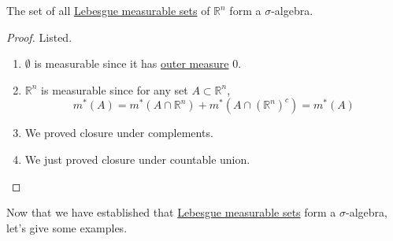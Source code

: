   \begin{corollary}
    \label{thm:measurable-sets-form-a-sigma-algebra}
    The set of all \hyperref[def:lebesgue-measurable-set]{Lebesgue measurable sets} of $\mathbb{R}^n$ form a $\sigma$-algebra. 
  \end{corollary}
  \begin{proof}
    Listed. 
    \begin{enumerate}
      \item $\emptyset$ is measurable since it has \hyperref[def:outer-measure]{outer measure} $0$. 
      \item $\mathbb{R}^n$ is measurable since for any set $A \subset \mathbb{R}^n$, 
      \begin{equation}
        m^\ast (A) = m^\ast(A \cap \mathbb{R}^n) + m^\ast(A \cap (\mathbb{R}^n)^c) = m^\ast(A) 
      \end{equation}
      \item We proved closure under complements. 
      \item We just proved closure under countable union. 
    \end{enumerate}
  \end{proof}

  Now that we have established that \hyperref[def:lebesgue-measurable-set]{Lebesgue measurable sets} form a $\sigma$-algebra, let's give some examples. 

